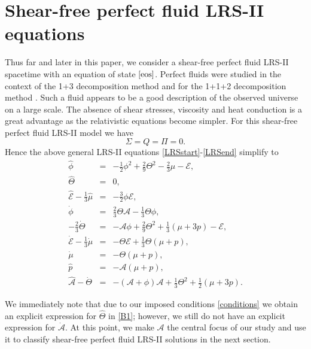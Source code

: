 \documentclass[abstract=on,notitlepage,superscriptaddress,nofootinbib,aps,showpacs,twocolumn,prd]{revtex4}
\newcommand{\0}{^{(0)}}
\newcommand{\1}{^{(1)}}
\newcommand{\2}{^{(2)}}
\newcommand{\3}{{}^{(3)}}
\begin{document}
\section{Shear-free perfect fluid LRS-II  equations}
Thus far and later in this paper, we consider a shear-free  perfect fluid LRS-II  spacetime with an equation of state $\eqref{eos}$. Perfect fluids were studied in the context of the 1+3 decomposition method \cite{vanElstEllis} and for the 1+1+2 decomposition method \cite{clarkson2007}. Such a fluid appears to be a good description of the observed universe on a large scale. The absence of  shear stresses, viscosity and heat conduction is a great advantage as the relativistic equations become simpler. For this shear-free  perfect fluid LRS-II model we have
\begin{equation}
\Sigma=Q=\Pi=0. \label{conditions}
\end{equation} 
Hence the above general LRS-II equations \eqref{LRSstart}-\eqref{LRSend} simplify to
\begin{eqnarray}
	\hat{\phi} &=& -\frac{1}{2}\phi^2+\frac{2}{9}\Theta^2-\frac{2}{3}\mu-\mathcal{E},\label{A1}\\	
	\hat{\Theta} &=& 0,\label{B1}\\	
	\hat{\mathcal{E}}-\frac{1}{3}\hat{\mu}&=&-\frac{3}{2}\phi\mathcal{E},\label{C1}\\	
	\dot{\phi}&=&\frac{2}{3}\Theta\mathcal{A}-\frac{1}{3}\Theta\phi,\label{D1}\\	
	-\frac{2}{3}\dot{\Theta}&=&-\mathcal{A}\phi+\frac{2}{9}\Theta^2+\frac{1}{3}(\mu+3p)-\mathcal{E},\label{E1} \\	
	\dot{\mathcal{E}}-\frac{1}{3}\dot{\mu}&=&-\Theta\mathcal{E}+\frac{1}{3}\Theta(\mu+p),\label{F1}\\	
	\dot{\mu} &=& -\Theta(\mu+p),\label{G1}\\	
	\hat{p} &=&-\mathcal{A}(\mu+p),\label{H1}\\	
	\hat{\mathcal{A}}-\dot{\Theta}&=&-(\mathcal{A}+\phi)\mathcal{A}+\frac{1}{3}\Theta^2+\frac{1}{2}(\mu+3p)\label{I1}.
\end{eqnarray}

We immediately note that due to our imposed conditions \eqref{conditions} we obtain an explicit expression for $\hat{\Theta}$ in \eqref{B1}; however, we still do not have an explicit expression for $\dot{\mathcal{A}}$. At this point, we make $\mathcal{A}$ the central focus of our study and use it to classify shear-free perfect fluid LRS-II  solutions in the next section.
\end{document}
